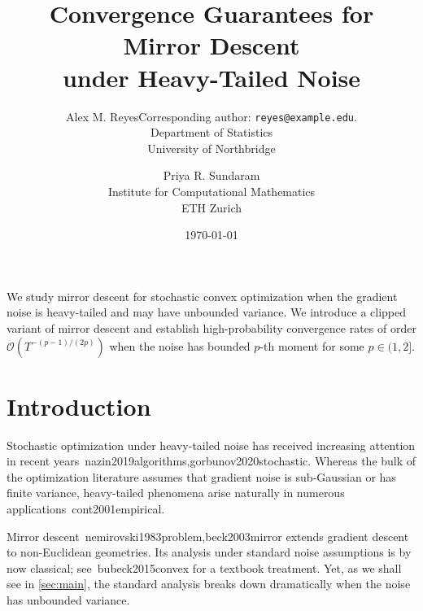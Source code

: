 \DeclareMathOperator*{\argmin}{arg\,min} \DeclareMathOperator{\Tr}{Tr}
\newcommand{\R}{\mathbb{R}} \newcommand{\E}{\mathbb{E}} \newcommand{\PP}{\mathbb{P}}
\newcommand{\norm}[1]{\left\lVert#1\right\rVert} \newcommand{\abs}[1]{\left\lvert#1\right\rvert}
\newcommand{\inner}[2]{\left\langle#1,#2\right\rangle} \newcommand{\set}[1]{\left\{#1\right\}}
\newcommand{\todo}[2][red]{\textcolor{#1}{\textbf{TODO:} #2}}

\title{Convergence Guarantees for Mirror Descent\\ under Heavy-Tailed Noise}
\author{ Alex M. ReyesCorresponding author: \texttt{reyes@example.edu}. \\ Department of Statistics \\ University of Northbridge  \and  Priya R. Sundaram \\ Institute for Computational Mathematics \\ ETH Zurich }
\date{\today}


\maketitle

We study mirror descent for stochastic convex optimization when the gradient noise is heavy-tailed and may have unbounded variance. We introduce a clipped variant of mirror descent and establish high-probability convergence rates of order $\mathcal{O}(T^{-(p-1)/(2p)})$ when the noise has bounded $p$-th moment for some $p \in (1, 2]$.

\section{Introduction}\label{sec:intro}

Stochastic optimization under heavy-tailed noise has received increasing attention in recent years~\cite{}nazin2019algorithms,gorbunov2020stochastic. Whereas the bulk of the optimization literature assumes that gradient noise is sub-Gaussian or has finite variance, heavy-tailed phenomena arise naturally in numerous applications~\cite{}cont2001empirical.

Mirror descent~\cite{}nemirovski1983problem,beck2003mirror extends gradient descent to non-Euclidean geometries. Its analysis under standard noise assumptions is by now classical; see~\cite{}bubeck2015convex for a textbook treatment. Yet, as we shall see in \cref{sec:main}, the standard analysis breaks down dramatically when the noise has unbounded variance.

